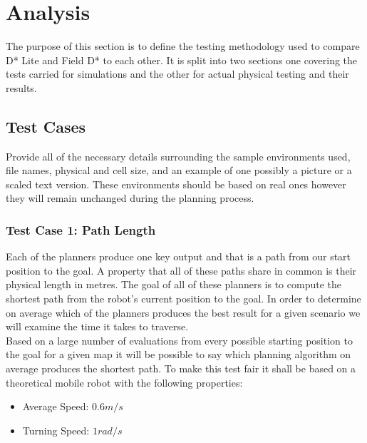 \chapter{Analysis}

\noindent
The purpose of this section is to define the testing methodology used to compare D* Lite and Field D* to each other. It is split into two sections one covering the tests carried for simulations and the other for actual physical testing and their results.


\section{Test Cases}

\noindent
Provide all of the necessary details surrounding the sample environments used, file names, physical and cell size, and an example of one possibly a picture or a scaled text version. These environments should be based on real ones however they will remain unchanged during the planning process.

\newpage

\subsection{Test Case 1: Path Length}\label{test 1}

\noindent 
Each of the planners produce one key output and that is a path from our start position to the goal. A property that all of these paths share in common is their physical length in metres. The goal of all of these planners is to compute the shortest path from the robot's current position to the goal. In order to determine on average which of the planners produces the best result for a given scenario we will examine the time it takes to traverse. \\

\noindent
Based on a large number of evaluations from every possible starting position to the goal for a given map it will be possible to say which planning algorithm on average produces the shortest path. To make this test fair it shall be based on a theoretical mobile robot with the following properties: 

\begin{itemize}
\item Average Speed: $0.6m/s$
\item Turning Speed: $1rad/s$ 
\end{itemize} 

